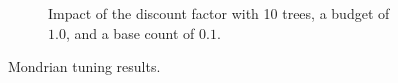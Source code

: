 \begin{figure}
\begin{subfigure}[b]{0.49\textwidth}
		 \caption{Impact of the discount factor with 10 trees, a budget of $1.0$, and a base count of $0.1$. }
		 \label{fig:mondrian-discount}
	 \end{subfigure}
		\caption{Mondrian tuning results.}
		\label{fig:mondrian-tuning}
\end{figure}


